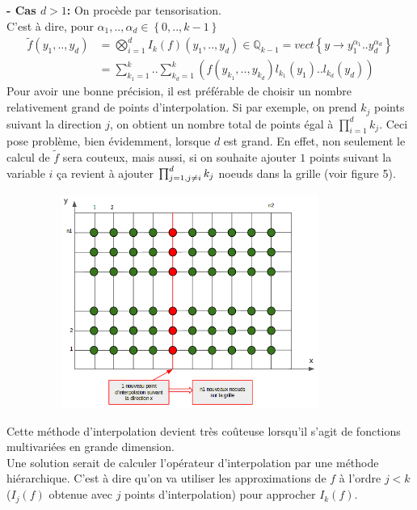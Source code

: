 \vspace{1cm}
\hspace{0.5cm}
\textbf{ - Cas $d>1$: }
On procède par tensorisation. \\
C'est à dire, pour $\alpha_1,..,\alpha_d \in \left \{0,.., k-1 \right \}$ \\
\begin{align}
   \tilde{f} (y_1,..,y_d)& = \bigotimes_{i=1}^d I_k (f)(y_1,..,y_d) \in \mathbb{Q}_{k-1} = vect \left \{ y \rightarrow y_1^{\alpha_1}..y_d^{\alpha_d} \right \} \\
	 & = \sum_{k_1=1}^k..\sum_{k_d=1}^k (f(y_{k_1},..,y_{k_d}) l_{k_1}(y_1)..l_{k_d}(y_d))
\end{align}
\hspace{0.5cm}
Pour avoir une bonne précision, il est préférable de choisir un nombre relativement grand de points d'interpolation.
Si par exemple, on prend $k_j$ points suivant la direction $j$, on obtient un nombre total de points égal à $\prod_{i=1}^d k_j$.
Ceci pose problème, bien évidemment, lorsque $d$ est grand. En effet, non seulement le calcul de $\tilde{f}$ sera couteux, mais aussi,
si on souhaite ajouter $1$ points suivant la variable $i$ ça revient à ajouter $\prod_{j=1,\\ j \neq i}^d k_j$ noeuds dans la grille (voir figure 5).\\
\begin{center}
\includegraphics[height=7cm,width=12cm]{images/grille.png}
\end{center}

Cette méthode d'interpolation devient très coûteuse lorsqu'il s'agit de fonctions multivariées en grande dimension.\\
Une solution serait de calculer l'opérateur d'interpolation par une méthode hiérarchique. C'est à dire qu'on va
utiliser les approximations de $f$ à l'ordre $j<k$ ($I_{j}(f)$ obtenue avec $j$ points d'interpolation) pour approcher $I_{k}(f)$.

